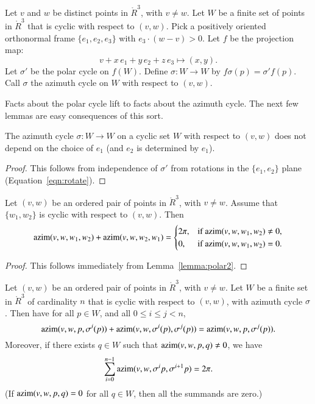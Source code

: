 \begin{definition}
Let $v$ and $w$ be distinct points in
$\ring{R}^3$, with $v\ne w$.
Let $W$ be a finite set of points in $\ring{R}^3$ that is
cyclic  with respect to $(v,w)$.
Pick a positively oriented orthonormal frame $\{e_1,e_2,e_3\}$
with $e_3\cdot (w-v) > 0$.
Let $f$ be the projection map:
   $$v + x\, e_1 + y\, e_2 + z\, e_3 \mapsto
     (x,y).$$
Let $\sigma'$ be the polar cycle on $f(W)$. Define 
$\sigma:W\to W$ by $f\sigma(p) =\sigma'f(p)$.
Call $\sigma$ the azimuth cycle
on $W$ with respect to $(v,w)$.
\end{definition}

Facts about the polar cycle lift to facts about the azimuth cycle.
The next few lemmas are easy consequences of this sort.


\begin{lemma} The azimuth cycle $\sigma:W\to W$ on
a cyclic set $W$ with respect to $(v,w)$ does not depend
on the choice of $e_1$ (and $e_2$ is determined by $e_1$).
\end{lemma}

\begin{proof} This follows from independence of $\sigma'$ from
rotations in the $\{e_1,e_2\}$ plane  (Equation~\ref{eqn:rotate}).
\end{proof}


\begin{lemma} 
Let $(v,w)$ be an ordered pair of points in $\ring{R}^3$,
with $v\ne w$.  Assume that $\{w_1,w_2\}$ is cyclic
with respect to $(v,w)$.  Then
  $$
  {\operatorname{azim}}(v,w,w_1,w_2) + {\operatorname{azim}}(v,w,w_2,w_1) 
  = \begin{cases} 2\pi, & \text{if }{\operatorname{azim}}(v,w,w_1,w_2)\ne 0,\\
    0, & \text{if }{\operatorname{azim}}(v,w,w_1,w_2)=0.
    \end{cases}
    $$
\end{lemma}

\begin{proof} This follows immediately from Lemma~\ref{lemma:polar2}.
\end{proof}

\begin{lemma} \label{lemma:2pi-sum}
Let $(v,w)$ be an ordered pair of points in $\ring{R}^3$,
with $v\ne w$.  Let $W$ be a finite set in $\ring{R}^3$ of
cardinality $n$ that
is cyclic with respect to $(v,w)$,
with azimuth cycle $\sigma$.
Then have for all $p\in W$,
and all $0\le i \le j < n$,
   $$
   {\operatorname{azim}}(v,w,p,\sigma^i(p)) +
    {\operatorname{azim}}(v,w,\sigma^i(p),\sigma^j(p)) =
   {\operatorname{azim}}(v,w,p,\sigma^j(p)).
   $$
Moreover, if there exists $q\in W$ such that 
${\operatorname{azim}}(v,w,p,q)\ne0$,
we have 
  $$
  \sum_{i=0}^{n-1} {\operatorname{azim}}(v,w,\sigma^ip,\sigma^{i+1}p) = 2\pi.
  $$
(If ${\operatorname{azim}}(v,w,p,q)=0$ for all $q\in W$, then all the
summands are zero.)
\end{lemma}

